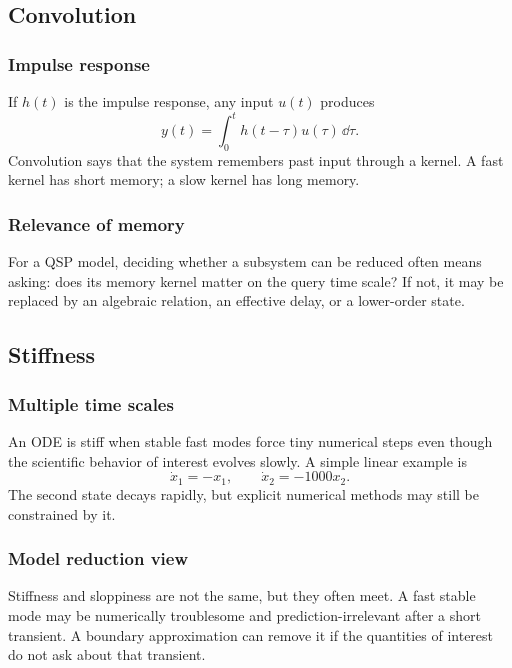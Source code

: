 \subsection{Convolution}

\subsubsection*{Impulse response}

If \(h(t)\) is the impulse response, any input \(u(t)\) produces
\[
  y(t)=\int_0^t h(t-\tau)u(\tau)\,\dd\tau.
\]
Convolution says that the system remembers past input through a kernel.  A fast kernel has short memory; a slow kernel has long memory.

\subsubsection*{Relevance of memory}

For a QSP model, deciding whether a subsystem can be reduced often means asking: does its memory kernel matter on the query time scale?  If not, it may be replaced by an algebraic relation, an effective delay, or a lower-order state.

\subsection{Stiffness}

\subsubsection*{Multiple time scales}

An ODE is stiff when stable fast modes force tiny numerical steps even though the scientific behavior of interest evolves slowly.  A simple linear example is
\[
  \dot{x}_1=-x_1,
  \qquad
  \dot{x}_2=-1000x_2.
\]
The second state decays rapidly, but explicit numerical methods may still be constrained by it.

\subsubsection*{Model reduction view}

Stiffness and sloppiness are not the same, but they often meet.  A fast stable mode may be numerically troublesome and prediction-irrelevant after a short transient.  A boundary approximation can remove it if the quantities of interest do not ask about that transient.

